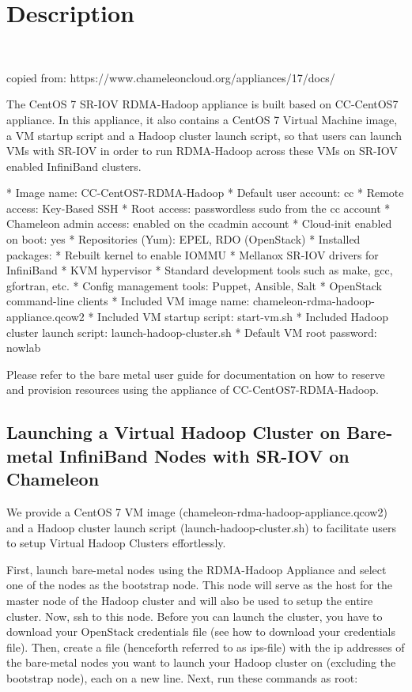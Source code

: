 \section{Description}

\FILENAME\

copied from: https://www.chameleoncloud.org/appliances/17/docs/

The CentOS 7 SR-IOV RDMA-Hadoop appliance is built based on CC-CentOS7
appliance. In this appliance, it also contains a CentOS 7 Virtual
Machine image, a VM startup script and a Hadoop cluster launch script,
so that users can launch VMs with SR-IOV in order to run RDMA-Hadoop
across these VMs on SR-IOV enabled InfiniBand clusters.

* Image name: CC-CentOS7-RDMA-Hadoop
* Default user account: cc
* Remote access: Key-Based SSH
* Root access: passwordless sudo from the cc account
* Chameleon admin access: enabled on the ccadmin account
* Cloud-init enabled on boot: yes
* Repositories (Yum): EPEL, RDO (OpenStack)
* Installed packages:
  * Rebuilt kernel to enable IOMMU
  * Mellanox SR-IOV drivers for InfiniBand
  * KVM hypervisor
  * Standard development tools such as make, gcc, gfortran, etc.
  * Config management tools: Puppet, Ansible, Salt
  * OpenStack command-line clients
* Included VM image name: chameleon-rdma-hadoop-appliance.qcow2
* Included VM startup script: start-vm.sh
* Included Hadoop cluster launch script: launch-hadoop-cluster.sh
* Default VM root password: nowlab


Please refer to the bare metal user guide for documentation on how to reserve and provision resources using the appliance of CC-CentOS7-RDMA-Hadoop.

\subsection{Launching a Virtual Hadoop Cluster on Bare-metal InfiniBand Nodes with SR-IOV on Chameleon}


We provide a CentOS 7 VM image (chameleon-rdma-hadoop-appliance.qcow2)
and a Hadoop cluster launch script (launch-hadoop-cluster.sh) to
facilitate users to setup Virtual Hadoop Clusters effortlessly.

First, launch bare-metal nodes using the RDMA-Hadoop Appliance and select one of the nodes as the bootstrap node. This node will serve as the host for the master node of the Hadoop cluster and will also be used to setup the entire cluster. Now, ssh to this node. Before you can launch the cluster, you have to download your OpenStack credentials file (see how to download your credentials file). Then, create a file (henceforth referred to as ips-file) with the ip addresses of the bare-metal nodes you want to launch your Hadoop cluster on (excluding the bootstrap node), each on a new line. Next, run these commands as root:

